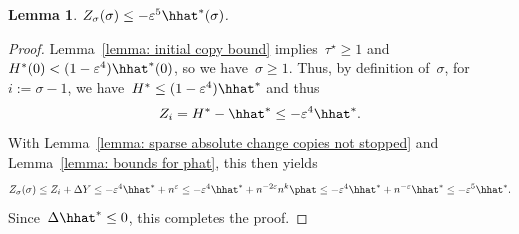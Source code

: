 \documentclass[11pt]{amsart}
\newcommand{\eps}{\varepsilon}
\newtheorem{lemma}[algocf]{Lemma}
\theoremstyle{definition}
\numberwithin{equation}{section}
\begin{document}
	\begin{lemma}\label{lemma: sparse initial error copies}
		$Z_{\sigma}(\sigma)\leq -\eps^5 \hhat^*(\sigma)$.
	\end{lemma}
	\begin{proof}
		Lemma~\ref{lemma: initial copy bound} implies~$\tau^\star\geq 1$ and~$H^*(0)<(1-\eps^4)\hhat^*(0)$, so we have~$\sigma\geq 1$.
		Thus, by definition of~$\sigma$, for~$i:=\sigma-1$, we have~$H^*\leq (1-\eps^4)\hhat^*$ and thus
		\begin{equation*}
			Z_i=H^*-\hhat^*\leq -\eps^4\hhat^*.
		\end{equation*}
		With Lemma~\ref{lemma: sparse absolute change copies not stopped} and Lemma~\ref{lemma: bounds for phat}, this then yields
		\begin{equation*}
			Z_\sigma(\sigma)
			\leq Z_i+\Delta Y
			\leq -\eps^4\hhat^*+n^\eps
			\leq -\eps^4\hhat^*+n^{-2\eps}n^k\phat
			\leq -\eps^4\hhat^*+n^{-\eps}\hhat^*
			\leq -\eps^5\hhat^*.
		\end{equation*}
		Since~$\Delta\hhat^*\leq 0$, this completes the proof.
	\end{proof}
	
\end{document}
